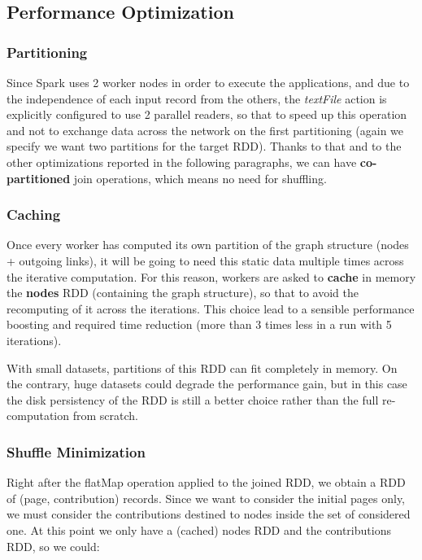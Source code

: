 \subsection{Performance Optimization}

\subsubsection{Partitioning}
Since Spark uses 2 worker nodes in order to execute the applications, and due to the independence of each input record from the others, the \textit{textFile} action is explicitly configured to use 2 parallel readers, so that to speed up this operation and not to exchange data across the network on the first partitioning (again we specify we want two partitions for the target RDD). Thanks to that and to the other optimizations reported in the following paragraphs, we can have \textbf{co-partitioned} join operations, which means no need for shuffling.


\subsubsection{Caching}
Once every worker has computed its own partition of the graph structure (nodes + outgoing links), it will be going to need this static data multiple times across the iterative computation. For this reason, workers are asked to \textbf{cache} in memory the \textbf{nodes} RDD (containing the graph structure), so that to avoid the recomputing of it across the iterations. This choice lead to a sensible performance boosting and required time reduction (more than 3 times less in a run with 5 iterations).

\noindent With small datasets, partitions of this RDD can fit completely in memory. On the contrary, huge datasets could degrade the performance gain, but in this case the disk persistency of the RDD is still a better choice rather than the full re-computation from scratch.   


\subsubsection{Shuffle Minimization}
Right after the flatMap operation applied to the joined RDD, we obtain a RDD of (page, contribution) records. Since we want to consider the initial pages only, we must consider the contributions destined to nodes inside the set of considered one. At this point we only have a (cached) nodes RDD and the contributions RDD, so we could:

